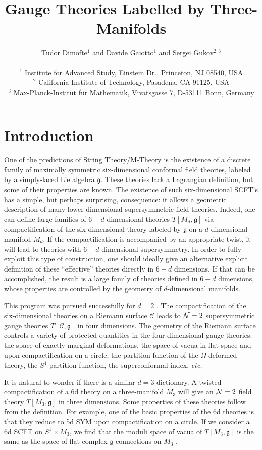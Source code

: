 \documentclass[hyper,letterpaper]{JHEP3}
\title{Gauge Theories Labelled by Three-Manifolds}
\author{Tudor Dimofte$^{1}$ and Davide Gaiotto$^1$ and Sergei Gukov$^{2,3}$
\\ ~
\\
$^1$ Institute for Advanced Study, Einstein Dr., Princeton, NJ 08540, USA\\
$^2$ California Institute of Technology, Pasadena, CA 91125, USA \\
$^3$ Max-Planck-Institut f\"ur Mathematik, Vivatsgasse 7, D-53111 Bonn, Germany}
\numberwithin{equation}{section}
\newcommand{\CC}{\mathcal{C}}
\begin{document}





\section{Introduction}
\label{sec:intro}
One of the predictions of String Theory/M-Theory is the existence of a discrete family
of maximally symmetric six-dimensional conformal field theories, labeled by a simply-laced Lie algebra $\mathfrak{g}$.
These theories lack a Lagrangian definition, but some of their properties are known.
The existence of such six-dimensional SCFT's has a simple, but perhaps surprising, consequence:
it allows a geometric description of many lower-dimensional supersymmetric field theories.
Indeed, one can define large families of $6-d$ dimensional theories $T[M_d,\mathfrak{g}]$
via compactification of the six-dimensional theory labeled by $\mathfrak{g}$ on a $d$-dimensional manifold $M_d$.
If the compactification is accompanied by an appropriate twist, it will lead to theories with $6-d$ dimensional supersymmetry.
In order to fully exploit this type of construction, one should ideally give an alternative explicit definition
of these ``effective'' theories directly in $6-d$ dimensions. If that can be accomplished, the result is a large family
of theories defined in $6-d$ dimensions, whose properties are controlled by the geometry of $d$-dimensional manifolds.

This program was pursued successfully for $d=2$ \cite{Gaiotto-dualities, GMN, AGT}.
The compactification of the six-dimensional theories on a Riemann surface $\CC$
leads to ${\cal N}=2$ supersymmetric gauge theories $T[\CC,\mathfrak{g}]$ in four dimensions.
The geometry of the Riemann surface controls a variety of protected quantities in the four-dimensional gauge theories:
the space of exactly marginal deformations, the space of vacua in flat space and upon compactification on a circle,
the partition function of the $\Omega$-deformed theory, the $S^4$ partition function, the superconformal index, {\it etc.}


It is natural to wonder if there is a similar $d=3$ dictionary.
A twisted compactification of a 6d theory on a three-manifold $M_3$
will give an ${\cal N}=2$ field theory $T[M_3,\mathfrak{g}]$ in three dimensions.
Some properties of these theories follow from the definition.
For example, one of the basic properties of the 6d theories is that they reduce to 5d SYM upon compactification on a circle.
If we consider a 6d SCFT on $S^1 \times M_3$, we find that the moduli space of vacua of $T[M_3,\mathfrak{g}]$
is the same as the space of flat complex $\mathfrak{g}$-connections on $M_3$ \cite{DGH}.
\end{document}
